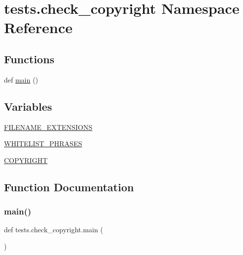 \hypertarget{namespacetests_1_1check__copyright}{}\section{tests.\+check\+\_\+copyright Namespace Reference}
\label{namespacetests_1_1check__copyright}
\subsection*{Functions}
\begin{DoxyCompactItemize}
\item 
def \hyperlink{namespacetests_1_1check__copyright_a9fcf3c755e0bf8e93320f2f09bd7ce04}{main} ()
\end{DoxyCompactItemize}
\subsection*{Variables}
\begin{DoxyCompactItemize}
\item 
\hyperlink{namespacetests_1_1check__copyright_af73f59f49275a23b52addda3278068db}{F\+I\+L\+E\+N\+A\+M\+E\+\_\+\+E\+X\+T\+E\+N\+S\+I\+O\+NS}
\item 
\hyperlink{namespacetests_1_1check__copyright_af4202011da6a1540735f6cf9f7a30c61}{W\+H\+I\+T\+E\+L\+I\+S\+T\+\_\+\+P\+H\+R\+A\+S\+ES}
\item 
\hyperlink{namespacetests_1_1check__copyright_a2aae78d9a278ab846941cce2c4c4c469}{C\+O\+P\+Y\+R\+I\+G\+HT}
\end{DoxyCompactItemize}


\subsection{Function Documentation}
\mbox{\label{namespacetests_1_1check__copyright_a9fcf3c755e0bf8e93320f2f09bd7ce04}} 
\subsubsection{\texorpdfstring{main()}{main()}}
{\footnotesize\ttfamily def tests.\+check\+\_\+copyright.\+main (\begin{DoxyParamCaption}{ }\end{DoxyParamCaption})}




